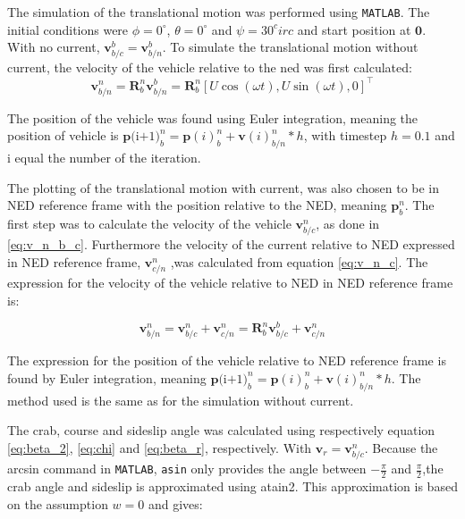 The simulation of the translational motion was performed using \texttt{MATLAB}. The initial conditions were $\phi = 0^\circ$, $\theta = 0^\circ$ and $\psi = 30^circ$ and start position at $\mathbf{0}$. With no current, $\mathbf{v}^b_{b/c} = \mathbf{v}^b_{b/n}$. To simulate the translational motion without current, the velocity of the vehicle relative to the ned was first calculated:
\begin{equation}
    \mathbf{v}^n_{b/n} = \mathbf{R}^n_b \mathbf{v}^b_{b/n} = \mathbf{R}^n_b [U \cos(\omega t), U \sin(\omega t), 0]^\top
    \label{eq:v_n_b_c}
\end{equation}


The position of the vehicle was found using Euler integration, meaning the position of vehicle is $\mathbf{p}\text{(i+1)}^n_{b} = \mathbf{p}(i)^n_{b} + \mathbf{v}(i)^n_{b/n}*h $, with timestep $h = 0.1$ and i equal the number of the iteration.
 
The  plotting of the translational motion with current, was also chosen to be in NED reference frame with the position relative to the NED, meaning $\mathbf{p}^n_{b}$. The first step was to calculate the velocity of the vehicle $\mathbf{v}^n_{b/c}$, as done in \eqref{eq:v_n_b_c}. Furthermore the velocity of the current relative to NED expressed in NED reference frame, $\mathbf{v}^n_{c/n}$ ,was calculated from equation \eqref{eq:v_n_c}. The expression for the velocity of the vehicle relative to NED  in NED reference frame is:


\begin{equation}
    \mathbf{v}^n_{b/n} = \mathbf{v}^n_{b/c} + \mathbf{v}^n_{c/n} = \mathbf{R}^n_b \mathbf{v}^b_{b/c} + \mathbf{v}^{n}_{c/n} 
    \label{eq:v_b_r}
\end{equation}

The expression for the position of the vehicle relative to NED reference frame is found by Euler integration, meaning $\mathbf{p}\text{(i+1)}^n_{b} = \mathbf{p}(i)^n_{b} + \mathbf{v}(i)^n_{b/n}*h $. The method used is the same as for the simulation without current.


The crab, course  and sideslip angle was calculated using respectively equation \eqref{eq:beta_2}, \eqref{eq:chi} and \eqref{eq:beta_r}, respectively. With $\mathbf{v}_r = \mathbf{v}^n_{b/c}$.  Because the arcsin command in \texttt{MATLAB}, \texttt{asin} only provides the angle between $-\frac{\pi}{2}$ and $\frac{\pi}{2}$,the crab angle and sideslip is approximated using atain2. This approximation is based on the assumption $w= 0$ and gives:

